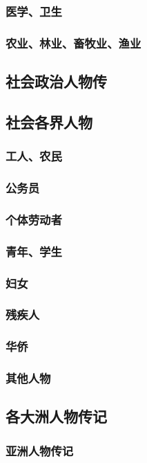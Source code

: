 \documentclass[UTF8]{../RepresentationUniverse}
\begin{document}
        \subsubsection{医学、卫生}
        \subsubsection{农业、林业、畜牧业、渔业}

    \subsection{社会政治人物传}
    \subsection{社会各界人物}
        \subsubsection{工人、农民}
        \subsubsection{公务员}
        \subsubsection{个体劳动者}
        \subsubsection{青年、学生}
        \subsubsection{妇女}
        \subsubsection{残疾人}
        \subsubsection{华侨}
        \subsubsection{其他人物}

    \subsection{各大洲人物传记}
        \subsubsection{亚洲人物传记}
\end{document}
